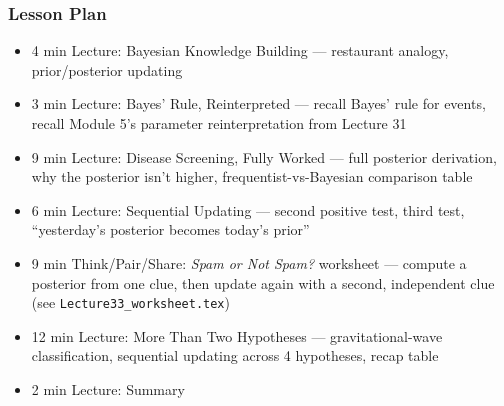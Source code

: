\begin{frame}
    \frametitle{Lesson Plan}
    \begin{itemize}
        \item 4 min Lecture: Bayesian Knowledge Building --- restaurant analogy, prior/posterior updating
        \item 3 min Lecture: Bayes' Rule, Reinterpreted --- recall Bayes' rule for events, recall Module 5's parameter reinterpretation from Lecture 31
        \item 9 min Lecture: Disease Screening, Fully Worked --- full posterior derivation, why the posterior isn't higher, frequentist-vs-Bayesian comparison table
        \item 6 min Lecture: Sequential Updating --- second positive test, third test, ``yesterday's posterior becomes today's prior''
        \item 9 min Think/Pair/Share: \textit{Spam or Not Spam?} worksheet --- compute a posterior from one clue, then update again with a second, independent clue (see \texttt{Lecture33\_worksheet.tex})
        \item 12 min Lecture: More Than Two Hypotheses --- gravitational-wave classification, sequential updating across 4 hypotheses, recap table
        \item 2 min Lecture: Summary
    \end{itemize}
\end{frame}

